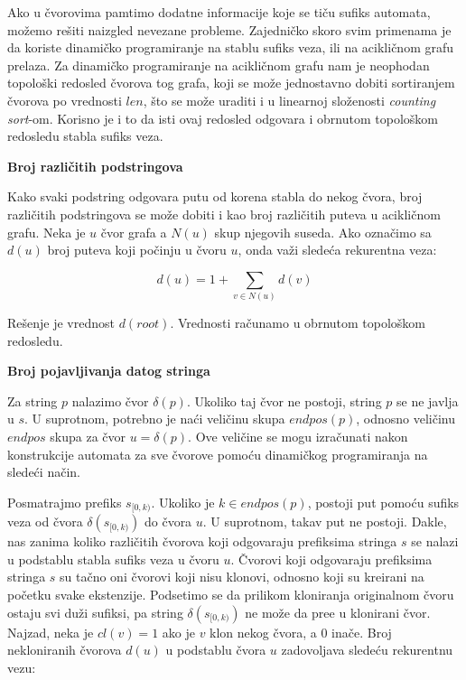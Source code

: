 Ako u \v cvorovima pamtimo dodatne informacije koje se ti\v cu sufiks automata, mo\v zemo re\v siti naizgled nevezane probleme. Zajedni\v cko skoro svim primenama je da koriste dinami\v cko programiranje na stablu sufiks veza, ili na acikli\v cnom grafu prelaza. Za dinami\v cko programiranje na acikli\v cnom grafu nam je neophodan topolo\v ski redosled \v cvorova tog grafa, koji se mo\v ze jednostavno dobiti sortiranjem \v cvorova po vrednosti $len$, \v sto se mo\v ze uraditi i u linearnoj slo\v zenosti \textit{counting sort}-om. Korisno je i to da isti ovaj redosled odgovara i obrnutom topolo\v skom redosledu stabla sufiks veza.

\noindent
\textbf{Broj razli\v citih podstringova}

Kako svaki podstring odgovara putu od korena stabla do nekog \v cvora, broj razli\v citih podstringova se mo\v ze dobiti i kao broj razli\v citih puteva u acikli\v cnom grafu. Neka je $u$ \v cvor grafa a $N(u)$ skup njegovih suseda. Ako ozna\v cimo sa $d(u)$ broj puteva koji po\v cinju u \v cvoru $u$, onda va\v zi slede\' ca rekurentna veza:

\begin{equation}
    d(u) = 1 + \sum_{v \in N(u)} d(v)
\end{equation}

Re\v senje je vrednost $d(root)$. Vrednosti ra\v cunamo u obrnutom topolo\v skom redosledu.

\noindent
\textbf{Broj pojavljivanja datog stringa}

Za string $p$ nalazimo \v cvor $\delta(p)$. Ukoliko taj \v cvor ne postoji, string $p$ se ne javlja u $s$. U suprotnom, potrebno je na\' ci veli\v cinu skupa $endpos(p)$, odnosno veli\v cinu $endpos$ skupa za \v cvor $u = \delta(p)$. Ove veli\v cine se mogu izra\v cunati nakon konstrukcije automata za sve \v cvorove pomo\' cu dinami\v ckog programiranja na slede\' ci na\v cin.

Posmatrajmo prefiks $s_{[0,k)}$. Ukoliko je $k \in endpos(p)$, postoji put pomo\' cu sufiks veza od \v cvora $\delta(s_{[0,k)})$ do \v cvora $u$. U suprotnom, takav put ne postoji. Dakle, nas zanima koliko razli\v citih \v cvorova koji odgovaraju prefiksima stringa $s$ se nalazi u podstablu stabla sufiks veza u \v cvoru $u$. \v Cvorovi koji odgovaraju prefiksima stringa $s$ su ta\v cno oni \v cvorovi koji nisu klonovi, odnosno koji su kreirani na po\v cetku svake ekstenzije. Podsetimo se da prilikom kloniranja originalnom \v cvoru ostaju svi du\v zi sufiksi, pa string $\delta(s_{[0,k)})$ ne mo\v ze da pre\dj e u klonirani \v cvor. Najzad, neka je $cl(v) = 1$ ako je $v$ klon nekog \v cvora, a $0$ ina\v ce. Broj nekloniranih \v cvorova $d(u)$ u podstablu \v cvora $u$ zadovoljava slede\' cu rekurentnu vezu:

